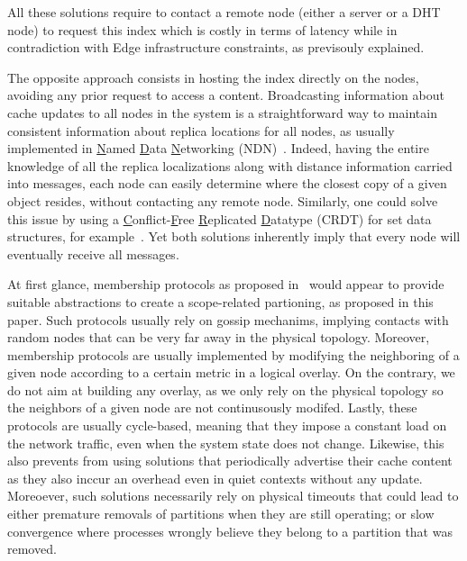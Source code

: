 All these solutions require to contact a remote node (either a server or a DHT node) to request this index 
which is costly in terms of latency while in contradiction with Edge infrastructure constraints, as previsouly explained.


The opposite approach consists in hosting the index directly on the nodes, avoiding any prior request to access a content.   
Broadcasting information about cache updates to all nodes in the system is a straightforward way to maintain consistent information about replica locations for all nodes, as usually implemented in \underline{N}amed \underline{D}ata \underline{N}etworking (NDN)~\cite{nlsr}.  Indeed, having the entire knowledge of all the replica localizations along with distance information carried into messages, each node can easily determine where the closest copy of a given object resides, without contacting any remote node.
Similarly, one could solve this issue by using a \underline{C}onflict-\underline{F}ree \underline{R}eplicated \underline{D}atatype (CRDT) for set data structures, for example~\cite{shapiro2011crdts}. Yet both solutions inherently imply that every node will eventually receive all messages. 


At first glance, membership protocols as proposed in~\cite{t-man} would appear to provide suitable abstractions to create a scope-related partioning, as proposed in this paper. Such protocols usually rely on gossip mechanims, implying contacts with random nodes that can be very far away in the physical topology. Moreover, membership protocols are usually implemented  by modifying the neighboring of a given node according to a certain metric in a logical overlay.
On the contrary, we do not aim at building any overlay, as we only rely on the physical topology so the neighbors of a given node are not continusously modifed. Lastly, these protocols are usually cycle-based, meaning that they impose a constant load on the network traffic, even when the system state does not change. Likewise, this also prevents from using solutions that periodically advertise their cache content~\cite{garcia-lopez, hemmati2015namebased} as they also inccur an overhead even in quiet contexts without any update. 
Moreoever, such solutions necessarily rely on physical timeouts that could lead to either premature removals of partitions when they are still operating; or slow convergence where processes wrongly believe they belong to a partition that was removed. 


